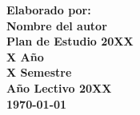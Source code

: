 \begin{titlepage}
\begin{center}
        \vspace{3cm}
        \large{\textbf{Elaborado por:}}\\
        \large{\textbf{Nombre del autor}}\\

        \vspace{2cm}
        \large{\textbf{Plan de Estudio 20XX}}\\
        \large{\textbf{X Año}}\\
        \large{\textbf{X Semestre}}\\
        \large{\textbf{Año Lectivo 20XX}}\\

        \vfill
        \small{\textbf{\today{}}}\\

    \end{center}
\end{titlepage}